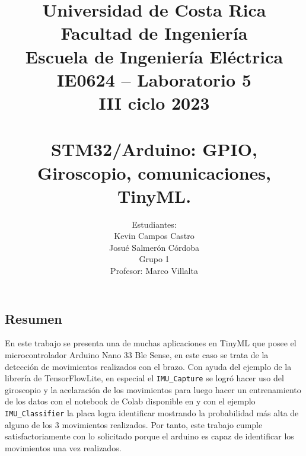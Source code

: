 \documentclass[12pt,a4paper]{article}
\author{Estudiantes:\\ Kevin Campos Castro\\ Josué Salmerón Córdoba  \\{\small Grupo 1}\\ Profesor:  Marco Villalta  \vspace*{3.0in}}
\title{Universidad de Costa Rica\\{\small Facultad de Ingeniería\\Escuela de Ingeniería Eléctrica\\IE0624 – Laboratorio 5\\III ciclo 2023\\\vspace*{0.55in}}\\ STM32/Arduino: GPIO, Giroscopio, comunicaciones, TinyML. \vspace*{1.35in}}
\begin{document}
 

\maketitle  
\thispagestyle{empty}%
\renewcommand{\thepage}{\roman{page}}
\newpage
\tableofcontents
\newpage
\listoffigures 
\newpage
\listoftables  
\newpage
\renewcommand{\thepage}{\arabic{page}} 
\setcounter{page}{1}
\begin{center}
\section{Resumen}
\end{center}
En este trabajo se presenta una de muchas aplicaciones en TinyML que posee el microcontrolador Arduino Nano 33 Ble Sense, en este caso se trata de la detección de movimientos realizados con el brazo. Con ayuda del ejemplo de la librería de TensorFlowLite, en especial el \texttt{IMU\_Capture} se logró hacer uso del giroscopio y la acelaración de los movimientos para luego hacer un entrenamiento de los datos con el notebook de Colab disponible en \cite{web4} y con el ejemplo \texttt{IMU\_Classifier} la placa logra identificar mostrando la probabilidad más alta de alguno de los 3 movimientos realizados. Por tanto, este trabajo cumple satisfactoriamente con lo solicitado porque el arduino es capaz de identificar los movimientos una vez realizados.


   
\newpage  


%





\newpage 


 
\end{document}
